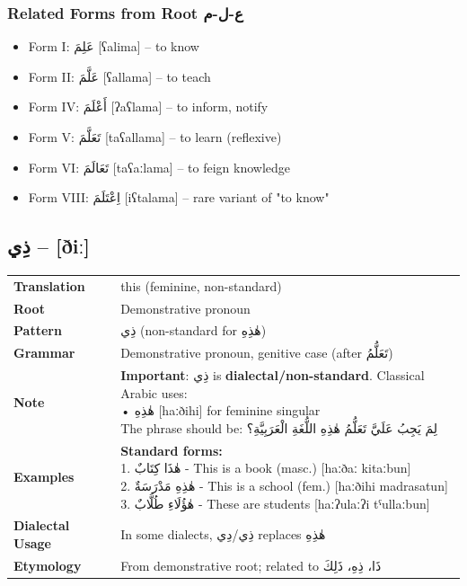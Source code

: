 \documentclass[letterpaper,12pt]{article}
\begin{document}
\subsubsection*{Related Forms from Root \textarabic{ع-ل-م}}
\begin{itemize}
  \item Form I: \textarabic{عَلِمَ} [ʕalima] – to know
  \item Form II: \textarabic{عَلَّمَ} [ʕallama] – to teach
  \item Form IV: \textarabic{أَعْلَمَ} [ʔaʕlama] – to inform, notify
  \item Form V: \textarabic{تَعَلَّمَ} [taʕallama] – to learn (reflexive)
  \item Form VI: \textarabic{تَعَالَمَ} [taʕaːlama] – to feign knowledge
  \item Form VIII: \textarabic{اِعْتَلَمَ} [iʕtalama] – rare variant of "to know"
\end{itemize}

\subsection{\textarabic{ذِي} – [ðiː]}

\begin{tabular}{p{3cm}p{10cm}}
\toprule
\textbf{Translation} & this (feminine, non-standard) \\
\textbf{Root} & Demonstrative pronoun \\
\textbf{Pattern} & \textarabic{ذِي} (non-standard for \textarabic{هٰذِهِ}) \\
\textbf{Grammar} & Demonstrative pronoun, genitive case (after \textarabic{تَعَلُّمُ}) \\
\midrule
\textbf{Note} & \makecell[l]{\parbox{9.5cm}{
\textbf{Important}: \textarabic{ذِي} is \textbf{dialectal/non-standard}. Classical Arabic uses:\\
• \textarabic{هٰذِهِ} [haːðihi] for feminine singular\\
The phrase should be: \textarabic{لِمَ يَجِبُ عَلَيَّ تَعَلُّمُ هٰذِهِ اللُّغَةِ الْعَرَبِيَّةِ؟}
}} \\
\midrule
\textbf{Examples} & \makecell[l]{\parbox{9.5cm}{
\textbf{Standard forms:}\\
1. \textarabic{هٰذَا كِتَابٌ} - This is a book (masc.) [haːðaː kitaːbun]\\
2. \textarabic{هٰذِهِ مَدْرَسَةٌ} - This is a school (fem.) [haːðihi madrasatun]\\
3. \textarabic{هٰؤُلَاءِ طُلَّابٌ} - These are students [haːʔulaːʔi tˤullaːbun]
}} \\
\midrule
\textbf{Dialectal Usage} & In some dialects, \textarabic{ذِي/دِي} replaces \textarabic{هٰذِهِ} \\
\textbf{Etymology} & From demonstrative root; related to \textarabic{ذَا، ذِهِ، ذَلِكَ} \\
\bottomrule
\end{tabular}
\end{document}
